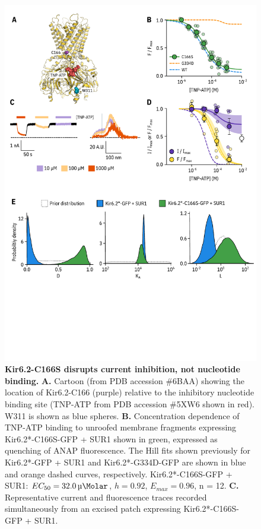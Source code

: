 \documentclass[9pt,lineno, onehalfspacing]{elife_modified}
\begin{document}
\begin{figure}
\begin{fullwidth}
\includegraphics[height=0.75\textheight]{figure_three}
\caption{
\textbf{Kir6.2-C166S disrupts current inhibition, not nucleotide binding.}
\textbf{A.}
Cartoon (from PDB accession \#6BAA) showing the location of Kir6.2-C166 (purple) relative to the inhibitory nucleotide binding site (TNP-ATP from PDB accession \#5XW6 shown in red).
W311 is shown as blue spheres.
\textbf{B.}
Concentration dependence of TNP-ATP binding to unroofed membrane fragments expressing Kir6.2*-C166S-GFP + SUR1 shown in green, expressed as quenching of ANAP fluorescence.
The Hill fits shown previously for Kir6.2*-GFP + SUR1 and Kir6.2*-G334D-GFP are shown in blue and orange dashed curves, respectively.
Kir6.2*-C166S-GFP + SUR1: $EC_{50} = \SI{32.0}{\micro\Molar}$, $h = 0.92$, $E_{max} = 0.96$, n = 12.
\textbf{C.}
Representative current and fluorescence traces recorded simultaneously from an excised patch expressing Kir6.2*-C166S-GFP + SUR1.
}
\end{fullwidth}
\end{figure}
\end{document}
